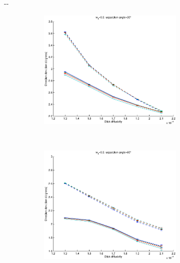 \documentclass{article}
\begin{document}
\begin{figure}[H]
\begin{adjustwidth}{-\oddsidemargin}{-\rightmargin}
    \begin{subfigure}{0.8\paperwidth}
      \begin{subfigure}{0.3\textwidth}
        \centering
        \includegraphics[width=\textwidth]{figures/synth_bas_diffus__snr=20__w1=3__angle=30.eps}
      \end{subfigure}
      ~
      \begin{subfigure}{0.3\textwidth}
        \centering
        \includegraphics[width=\textwidth]{figures/synth_bas_diffus__snr=20__w1=3__angle=60.eps}
      \end{subfigure}

\end{subfigure}
\end{adjustwidth}
\end{figure}
\end{document}
